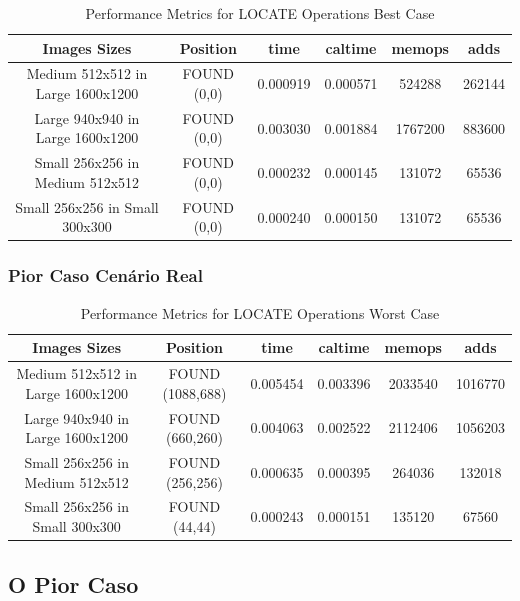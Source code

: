 \documentclass{report}
\begin{document}
\begin{table}[h]
    \centering
    \begin{tabular}{cccccc}
        \toprule
        \textbf{Images Sizes} & \textbf{Position} & \textbf{time} & \textbf{caltime} & \textbf{memops} & \textbf{adds}\\
        \midrule
        Medium 512x512 in Large 1600x1200 & FOUND (0,0) & 0.000919 & 0.000571 & 524288 & 262144 \\
        Large 940x940 in Large 1600x1200 & FOUND (0,0) & 0.003030 & 0.001884 & 1767200 & 883600 \\
        Small 256x256 in Medium 512x512 & FOUND (0,0) & 0.000232 & 0.000145 & 131072 & 65536 \\
        Small 256x256 in Small 300x300 & FOUND (0,0) & 0.000240 & 0.000150 & 131072 & 65536 \\
        \bottomrule
    \end{tabular}
    \caption{Performance Metrics for LOCATE Operations Best Case}
\end{table}

\newpage


\subsubsection{Pior Caso Cenário Real}


\begin{table}[h]
    \centering
    \begin{tabular}{cccccc}
        \toprule
        \textbf{Images Sizes} & \textbf{Position} & \textbf{time} & \textbf{caltime} & \textbf{memops} & \textbf{adds}\\
        \midrule
        Medium 512x512 in Large 1600x1200 & FOUND (1088,688) & 0.005454 & 0.003396 & 2033540 & 1016770 \\
        Large 940x940 in Large 1600x1200 & FOUND (660,260) & 0.004063 & 0.002522 & 2112406 & 1056203 \\
        Small 256x256 in Medium 512x512 & FOUND (256,256) & 0.000635 & 0.000395 & 264036 & 132018 \\
        Small 256x256 in Small 300x300 & FOUND (44,44) & 0.000243 & 0.000151 & 135120 & 67560 \\
        \bottomrule
    \end{tabular}
    \caption{Performance Metrics for LOCATE Operations Worst Case}
\end{table}

\subsection{O Pior Caso}
\end{document}
